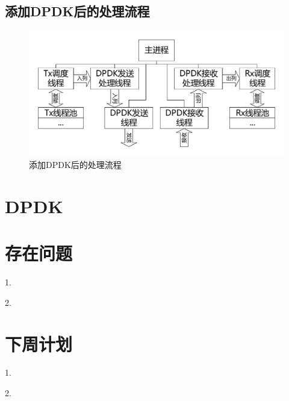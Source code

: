\documentclass{article}
\begin{document}
\subsection{添加DPDK后的处理流程}
\begin{figure}[H]
	\centering
	\includegraphics[width = \textwidth]{frame_step2.pdf}
	\caption{添加DPDK后的处理流程}
\end{figure}

\section{DPDK}

\section{存在问题}
1. 

2. 

\section{下周计划}
1. 

2. 
\end{document}
